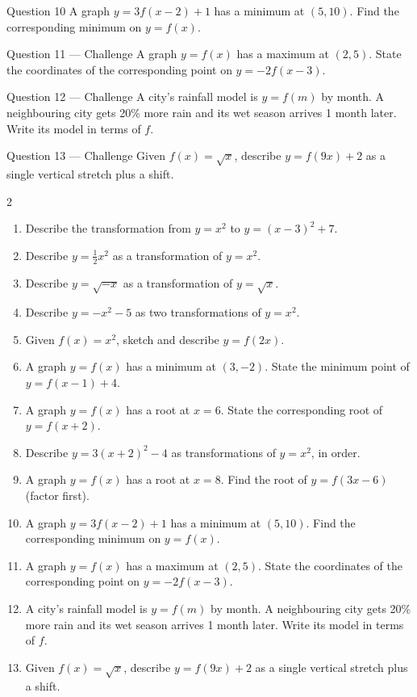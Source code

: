 \documentclass[11pt]{article}
\begin{document}
\begin{qbox}{Question 10}
A graph $y=3f(x-2)+1$ has a minimum at $(5,10)$. Find the corresponding minimum on $y=f(x)$.\workspace{2.4cm}
\end{qbox}

\begin{qbox}{Question 11 --- Challenge}
A graph $y=f(x)$ has a maximum at $(2,5)$. State the coordinates of the corresponding point on $y=-2f(x-3)$.\workspace{3.2cm}
\end{qbox}

\begin{qbox}{Question 12 --- Challenge}
A city's rainfall model is $y=f(m)$ by month. A neighbouring city gets 20\% more rain and its wet season arrives 1 month later. Write its model in terms of $f$.\workspace{3.2cm}
\end{qbox}

\begin{qbox}{Question 13 --- Challenge}
Given $f(x)=\sqrt x$, describe $y=f(9x)+2$ as a single vertical stretch plus a shift.\workspace{3cm}
\end{qbox}

\clearpage
{}

\begin{recapbox}
\begin{multicols}{2}
\small
\begin{enumerate}[leftmargin=*,itemsep=3pt]
  \item Describe the transformation from $y=x^2$ to $y=(x-3)^2+7$.
  \item Describe $y=\tfrac12x^2$ as a transformation of $y=x^2$.
  \item Describe $y=\sqrt{-x}$ as a transformation of $y=\sqrt x$.
  \item Describe $y=-x^2-5$ as two transformations of $y=x^2$.
  \item Given $f(x)=x^2$, sketch and describe $y=f(2x)$.
  \item A graph $y=f(x)$ has a minimum at $(3,-2)$. State the minimum point of $y=f(x-1)+4$.
  \item A graph $y=f(x)$ has a root at $x=6$. State the corresponding root of $y=f(x+2)$.
  \item Describe $y=3(x+2)^2-4$ as transformations of $y=x^2$, in order.
  \item A graph $y=f(x)$ has a root at $x=8$. Find the root of $y=f(3x-6)$ (factor first).
  \item A graph $y=3f(x-2)+1$ has a minimum at $(5,10)$. Find the corresponding minimum on $y=f(x)$.
  \item A graph $y=f(x)$ has a maximum at $(2,5)$. State the coordinates of the corresponding point on $y=-2f(x-3)$.
  \item A city's rainfall model is $y=f(m)$ by month. A neighbouring city gets 20\% more rain and its wet season arrives 1 month later. Write its model in terms of $f$.
  \item Given $f(x)=\sqrt x$, describe $y=f(9x)+2$ as a single vertical stretch plus a shift.
\end{enumerate}
\end{multicols}
\end{recapbox}
\end{document}
